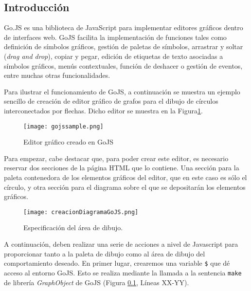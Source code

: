 \subsection{Introducción}

Go.JS \cite{gojs} es una biblioteca de JavaScript para implementar editores gráficos dentro de interfaces web. GoJS facilita la implementación de funciones tales como definición de símbolos gráficos, gestión de paletas de símbolos, arrastrar y soltar (\emph{drag and drop}), copiar y pegar, edición de etiquetas de texto asociadas a símbolos gráficos, menús contextuales, función de deshacer o gestión de eventos, entre muchas otras funcionalidades.

Para ilustrar el funcionamiento de GoJS, a continuación se muestra un ejemplo sencillo de creación de editor gráfico de grafos
para el dibujo de círculos interconectados por flechas. Dicho editor se muestra en la Figura\ref{fig:gojssample}.


\begin{figure}[!tb]
	\centering
	\texttt{[image: gojssample.png]}
	\caption{Editor gráfico creado en GoJS}
    \label{fig:gojssample}
\end{figure}

Para empezar, cabe destacar que, para poder crear este editor, es necesario reservar dos secciones de la página HTML que lo contiene. Una sección para la paleta contenedora de los elementos gráficos del editor, que en este caso es sólo el círculo, y otra sección para el diagrama sobre el que se depositarán los elementos gráficos. 

\begin{figure}[!tb]
	\centering
	\texttt{[image: creacionDiagramaGoJS.png]}
	\caption{Especificación del área de dibujo.}
    \label{fig:creacionDiagramaGoJS}
\end{figure}

A continuación, deben realizar una serie de acciones a nivel de Javascript para proporcionar tanto a la paleta de dibujo como al área de dibujo del comportamiento deseado. En primer lugar, crearemos una variable \texttt{\$} que dé acceso al entorno GoJS. Esto se realiza mediante la llamada a la sentencia \texttt{make} de librería \emph{GraphObject} de GoJS (Figura \ref{}, Líneas XX-YY).

